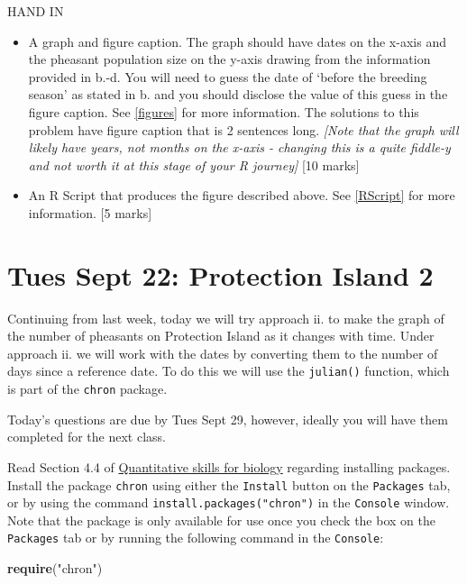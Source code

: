 \documentclass[]{book}
\newenvironment{Shaded}{\begin{snugshade}}{\end{snugshade}}
\newcommand{\KeywordTok}[1]{\textcolor[rgb]{0.13,0.29,0.53}{\textbf{{#1}}}}
\newcommand{\StringTok}[1]{\textcolor[rgb]{0.31,0.60,0.02}{{#1}}}
\newcommand{\NormalTok}[1]{{#1}}
\begin{document}
 HAND IN

\begin{itemize}
\item
   A graph and figure caption. The graph should have dates on the x-axis
  and the pheasant population size on the y-axis drawing from the
  information provided in b.-d. You will need to guess the date of
  `before the breeding season' as stated in b. and you should disclose
  the value of this guess in the figure caption. See \ref{figures} for
  more information. The solutions to this problem have figure caption
  that is 2 sentences long. \emph{{[}Note that the graph will likely
  have years, not months on the x-axis - changing this is a quite
  fiddle-y and not worth it at this stage of your R journey{]}} {[}10
  marks{]} 
\item
   An R Script that produces the figure described above. See
  \ref{RScript} for more information. {[}5 marks{]} 
\end{itemize}

\chapter{Tues Sept 22: Protection Island 2}\label{PE2}

Continuing from last week, today we will try approach ii. to make the
graph of the number of pheasants on Protection Island as it changes with
time. Under approach ii. we will work with the dates by converting them
to the number of days since a reference date. To do this we will use the
\texttt{julian()} function, which is part of the \texttt{chron} package.

Today's questions are due by Tues Sept 29, however, ideally you will
have them completed for the next class.

Read Section 4.4 of
\href{https://ahurford.github.io/quant-guide-all-courses/}{Quantitative
skills for biology} regarding installing packages. Install the package
\texttt{chron} using either the \texttt{Install} button on the
\texttt{Packages} tab, or by using the command
\texttt{install.packages("chron")} in the \texttt{Console} window. Note
that the package is only available for use once you check the box on the
\texttt{Packages} tab or by running the following command in the
\texttt{Console}:

\begin{Shaded}
\begin{Highlighting}[]
\KeywordTok{require}\NormalTok{(}\StringTok{"chron"}\NormalTok{)}
\end{Highlighting}
\end{Shaded}
\end{document}
